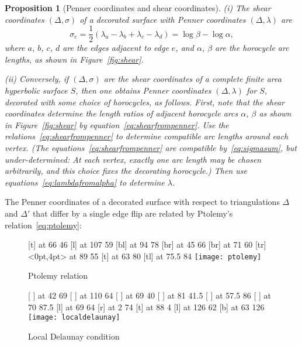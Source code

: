 \documentclass[a4paper, 11pt]{article}
\theoremstyle{plain}
\newtheorem{proposition}[theorem]{Proposition}
\theoremstyle{definition}
\begin{document}
\begin{proposition}[Penner coordinates and shear coordinates]
  \label{prop:pennershear}
  (i) The shear coordinates $(\Delta,\sigma)$ of a decorated surface
  with Penner coordinates $(\Delta,\lambda)$ are
  \begin{equation}
    \label{eq:shearfrompenner}
    \sigma_{e}=\frac{1}{2}(\lambda_{a}-\lambda_{b}+\lambda_{c}-\lambda_{d})
    =\log\beta-\log\alpha,
  \end{equation}
  where $a$, $b$, $c$, $d$ are the edges adjacent to edge $e$, and
  $\alpha$, $\beta$ are the horocycle arc lengths, as shown
  in Figure~\ref{fig:shear}.
  
  (ii) Conversely, if $(\Delta,\sigma)$ are the shear coordinates of a
  complete finite area hyperbolic surface $S$, then one obtains Penner
  coordinates $(\Delta,\lambda)$ for $S$, decorated with some choice
  of horocycles, as follows. First, note that the shear coordinates
  determine the length ratios of adjacent horocycle arcs $\alpha$,
  $\beta$ as shown in Figure~\ref{fig:shear} by
  equation~\eqref{eq:shearfrompenner}.  Use the
  relations~\eqref{eq:shearfrompenner} to determine compatible arc
  lengths around each vertex. (The
  equations~\eqref{eq:shearfrompenner} are compatible
  by~\eqref{eq:sigmasum}, but under-determined: At each vertex,
  exactly one arc length may be chosen arbitrarily, and this choice
  fixes the decorating horocycle.) Then use
  equations~\eqref{eq:lambdafromalpha} to determine $\lambda$.
\end{proposition}

The Penner coordinates of a decorated surface with respect to
triangulations $\Delta$ and $\Delta'$ that differ by a single edge
flip are related by Ptolemy's relation~\eqref{eq:ptolemy}:
\begin{figure}
  \begin{minipage}[t]{0.5\linewidth}
    \small\hair 2pt 
     [t] at 66 46 
     [l] at 107 59 
     [bl] at 94 78 
     [br] at 45 66 
     [br] at 71 60 
     [tr] <0pt,4pt> at 89 55 
     [t] at 63 80 
     [tl] at 75.5 84
    \endlabellist
    \centering
    \texttt{[image: ptolemy]}
    \caption{Ptolemy relation}
    \label{fig:ptolemy}
  \end{minipage}
  \begin{minipage}[t]{0.5\linewidth}
    \small\hair 2pt 
    \pinlabel {$\alpha$} [ ] at 42 69
     [ ] at 110 64
    \pinlabel {$\beta$} [ ] at 69 40
     [ ] at 81 41.5
    \pinlabel {$\gamma$} [ ] at 57.5 86
     [ ] at 70 87.5
     [l] at 69 64
     [r] at 2 74
     [t] at 88 4
     [l] at 126 62
     [b] at 63 126
    \endlabellist
    \centering
    \texttt{[image: localdelaunay]}
    \caption{Local Delaunay condition}
    \label{fig:localdel}
  \end{minipage}
\end{figure}
\end{document}
